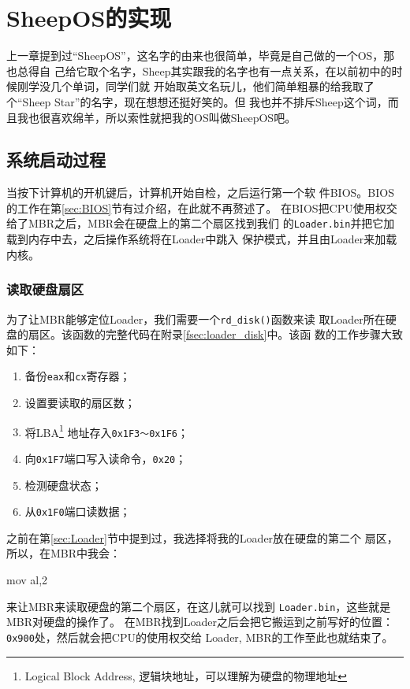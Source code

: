 \chapter{SheepOS的实现}

上一章提到过“SheepOS”，这名字的由来也很简单，毕竟是自己做的一个OS，那也总得自
己给它取个名字，Sheep其实跟我的名字也有一点关系，在以前初中的时候刚学没几个单词，同学们就
开始取英文名玩儿，他们简单粗暴的给我取了个“Sheep Star”的名字，现在想想还挺好笑的。但
我也并不排斥Sheep这个词，而且我也很喜欢绵羊，所以索性就把我的OS叫做SheepOS吧。

\section{系统启动过程}
\label{sec:booting}

当按下计算机的开机键后，计算机开始自检，之后运行第一个软
件BIOS。BIOS的工作在第\ref{sec:BIOS}节有过介绍，在此就不再赘述了。
在BIOS把CPU使用权交给了MBR之后，MBR会在硬盘上的第二个扇区找到我们
的\texttt{Loader.bin}并把它加载到内存中去，之后操作系统将在Loader中跳入
保护模式，并且由Loader来加载内核。

\subsection{读取硬盘扇区}

为了让MBR能够定位Loader，我们需要一个\texttt{rd\_disk()}函数来读
取Loader所在硬盘的扇区。该函数的完整代码在附录\ref{fsec:loader_disk}中。该函
数的工作步骤大致如下：
\begin{enumerate}
\item 备份\texttt{eax}和\texttt{cx}寄存器；
\item 设置要读取的扇区数；
\item 将LBA\footnote{Logical Block Address, 逻辑块地址，可以理解为硬盘的物理地址}
地址存入\texttt{0x1F3～0x1F6}；
\item 向\texttt{0x1F7}端口写入读命令，\texttt{0x20}；
\item 检测硬盘状态；
\item 从\texttt{0x1F0}端口读数据；
\end{enumerate}

之前在第\ref{sec:Loader}节中提到过，我选择将我的Loader放在硬盘的第二个
扇区，所以，在MBR中我会：
\begin{codeblock}
  \begin{nasmcode}
    mov al,2
  \end{nasmcode}
\end{codeblock}
来让MBR来读取硬盘的第二个扇区，在这儿就可以找到
\texttt{Loader.bin}，这些就是MBR对硬盘的操作了。
在MBR找到Loader之后会把它搬运到之前写好的位置：\texttt{0x900}处，然后就会把CPU的使用权交给
Loader, MBR的工作至此也就结束了。

